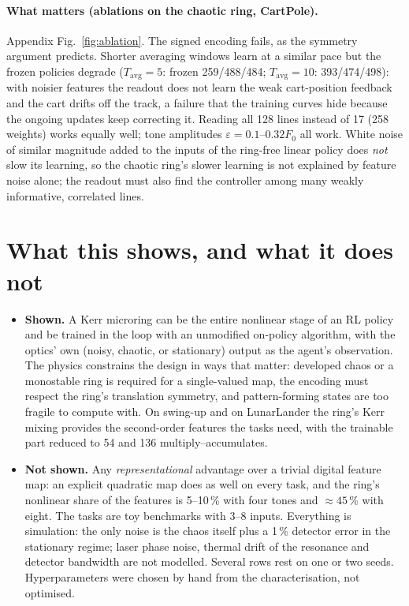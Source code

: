 \documentclass[10pt,a4paper]{article}
\newcommand{\Tavg}{T_{\mathrm{avg}}}
\newcommand{\Fz}{F_0}
\begin{document}
\paragraph{What matters (ablations on the chaotic ring, CartPole).}  Appendix Fig.~\ref{fig:ablation}.  The signed
encoding fails, as the symmetry argument predicts.  Shorter averaging windows learn at a similar pace but the frozen policies
degrade ($\Tavg=5$: frozen 259/488/484; $\Tavg=10$: 393/474/498): with noisier features the readout does not learn the weak
cart-position feedback and the cart drifts off the track, a failure that the training curves hide because the ongoing
updates keep correcting it.  Reading all 128 lines instead of 17 (258 weights) works equally well; tone amplitudes
$\varepsilon=0.1$--$0.32\Fz$ all work.  White noise of similar magnitude added to the inputs of the ring-free linear policy does
\emph{not} slow its learning, so the chaotic ring's slower learning is not explained by feature noise alone; the readout
must also find the controller among many weakly informative, correlated lines.

\section{What this shows, and what it does not}
\begin{itemize}[itemsep=2pt]
\item \textbf{Shown.}  A Kerr microring can be the entire nonlinear stage of an RL policy and be trained in the loop with an
unmodified on-policy algorithm, with the optics' own (noisy, chaotic, or stationary) output as the agent's observation.
The physics constrains the design in ways that matter: developed chaos or a monostable ring is required for a
single-valued map, the encoding must respect the ring's translation symmetry, and pattern-forming states are too fragile
to compute with.  On swing-up and on LunarLander the ring's Kerr mixing provides the second-order features the tasks need,
with the trainable part reduced to 54 and 136 multiply--accumulates.
\item \textbf{Not shown.}  Any \emph{representational} advantage over a trivial digital feature map: an explicit quadratic
map does as well on every task, and the ring's nonlinear share of the features is 5--10\,\% with four tones and
$\approx45$\,\% with eight.  The tasks are toy benchmarks with 3--8 inputs.  Everything is simulation: the only noise is the chaos itself plus a 1\,\% detector error in the stationary
regime; laser phase noise, thermal drift of the resonance and detector bandwidth are not modelled.  Several rows rest on
one or two seeds.  Hyperparameters were chosen by hand from the characterisation, not optimised.
\end{itemize}
\end{document}
